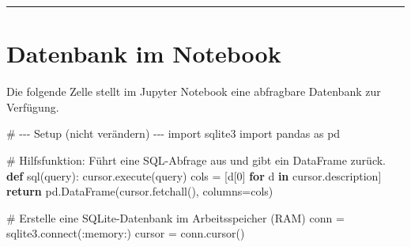 \documentclass[
  nswissgerman,
  a4paper,
  DIV=11,
  numbers=noendperiod,
  ngerman]{scrreprt}
\newenvironment{Shaded}{\begin{snugshade}}{\end{snugshade}}
\newcommand{\CommentTok}[1]{\textcolor[rgb]{0.37,0.37,0.37}{#1}}
\newcommand{\ControlFlowTok}[1]{\textcolor[rgb]{0.00,0.23,0.31}{\textbf{#1}}}
\newcommand{\DecValTok}[1]{\textcolor[rgb]{0.68,0.00,0.00}{#1}}
\newcommand{\ExtensionTok}[1]{\textcolor[rgb]{0.00,0.23,0.31}{#1}}
\newcommand{\ImportTok}[1]{\textcolor[rgb]{0.00,0.46,0.62}{#1}}
\newcommand{\KeywordTok}[1]{\textcolor[rgb]{0.00,0.23,0.31}{\textbf{#1}}}
\newcommand{\NormalTok}[1]{\textcolor[rgb]{0.00,0.23,0.31}{#1}}
\newcommand{\OperatorTok}[1]{\textcolor[rgb]{0.37,0.37,0.37}{#1}}
\newcommand{\StringTok}[1]{\textcolor[rgb]{0.13,0.47,0.30}{#1}}
\begin{document}
\begin{center}\rule{0.5\linewidth}{0.5pt}\end{center}

\section{Datenbank im Notebook}\label{datenbank-im-notebook}

Die folgende Zelle stellt im Jupyter Notebook eine abfragbare Datenbank
zur Verfügung.

\begin{Shaded}
\begin{Highlighting}[numbers=left,,]
\CommentTok{\# {-}{-}{-} Setup (nicht verändern) {-}{-}{-}}
\ImportTok{import}\NormalTok{ sqlite3}
\ImportTok{import}\NormalTok{ pandas }\ImportTok{as}\NormalTok{ pd}

\CommentTok{\# Hilfsfunktion: Führt eine SQL{-}Abfrage aus und gibt ein DataFrame zurück.}
\KeywordTok{def}\NormalTok{ sql(query):}
\NormalTok{    cursor.execute(query)}
\NormalTok{    cols }\OperatorTok{=}\NormalTok{ [d[}\DecValTok{0}\NormalTok{] }\ControlFlowTok{for}\NormalTok{ d }\KeywordTok{in}\NormalTok{ cursor.description]}
    \ControlFlowTok{return}\NormalTok{ pd.DataFrame(cursor.fetchall(), columns}\OperatorTok{=}\NormalTok{cols)}

\CommentTok{\# Erstelle eine SQLite{-}Datenbank im Arbeitsspeicher (RAM)}
\NormalTok{conn }\OperatorTok{=}\NormalTok{ sqlite3.}\ExtensionTok{connect}\NormalTok{(}\StringTok{\textquotesingle{}:memory:\textquotesingle{}}\NormalTok{)}
\NormalTok{cursor }\OperatorTok{=}\NormalTok{ conn.cursor()}


\end{Highlighting}
\end{Shaded}
\end{document}
